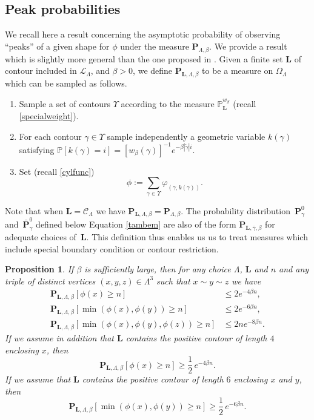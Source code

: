 \documentclass[JEP,XML,SOM,Unicode, NoFloatCountersInSection]{cedram}
\let\mathcal\mathscr
\numberwithin{equation}{section}
\theoremstyle{plain}
\newtheorem{proposition}[theorem]{Proposition}
\theoremstyle{definition}
\newcommand{\cC}{{\ensuremath{\mathcal C}} }
\newcommand{\cL}{{\ensuremath{\mathcal L}} }
\newcommand{\bP}{{\ensuremath{\mathbf P}} }
\newcommand{\bL}{{\ensuremath{\mathbf L}} }
\newcommand{\bbP}{{\ensuremath{\mathbb P}} }
\newcommand{\gb}{\beta}
\newcommand{\gO}{\Omega}
\newcommand{\gL}{\Lambda}
\begin{document}
\subsection{Peak probabilities}\label{peaksec}

We recall here a result concerning the asymptotic probability of observing ``peaks'' of a given shape for $\phi$ under the measure $\bP_{\gL,\gb}$.
We provide a result which is slightly more general than the one proposed in \cite[Prop.\,4.5]{cf:part1}.
Given a finite set $\bL$ of contour included in $\cL_\gL$, and $\gb>0$, we define $\bP_{\bL,\gL,\gb}$ to be a measure on $\gO_{\gL}$
which can be sampled as follows.
\begin{enumerate}
\item [(A)] Sample a set of contours $\Upsilon$ according to the measure $\bbP^{w_{\gb}}_{\bL}$ (recall \eqref{specialweight}).
\item [(B)] For each contour $\gamma\in \Upsilon$ sample independently a geometric variable $k(\gamma)$ satisfying
$\bbP[k(\gamma)=i]=[w_{\gb}(\gamma)]^{-1} e^{-\gb|\tilde \gamma|i}$.
\item [(C)] Set (recall \eqref{cylfunc})
\[
\phi:=\sum_{\gamma\in \Upsilon} \varphi_{(\gamma,k(\gamma))}.
\]
\end{enumerate}
Note that when $\bL=\cC_{\gL}$ we have $\bP_{\bL,\gL,\gb}=\bP_{\gL,\gb}$. The probability distribution~$\bP^0_{\gamma}$ and~$\bar \bP^0_{\gamma}$ defined below
Equation \eqref{tambem} are also of the form $\bP_{\bL,\bar \gamma,\gb}$ for adequate choices of~$\bL$.
This definition thus enables us us to treat measures which include special boundary condition or contour restriction.

\begin{proposition}\label{rouxrou}
If $\gb$ is sufficiently large, then for any choice $\gL$, $\bL$ and $n$ and any triple of distinct vertices $(x,y,z)\in \gL^3$
such that $x\sim y \sim z$ we have
\begin{equation}\label{zups}
\begin{split}
\bP_{\bL,\gL,\gb}[\phi(x)\ge n]&\le 2 e^{-4\gb n},\\
\bP_{\bL,\gL,\gb}[\min(\phi(x),\phi(y)) \ge n]&\le 2 e^{-6\gb n},\\
\bP_{\bL,\gL,\gb}[\min(\phi(x),\phi(y),\phi(z))\ge n]&\le 2 ne^{-8\gb n}.
\end{split}
\end{equation}
If we assume in addition that $\bL$ contains the positive contour of length $4$ enclosing $x$, then
\begin{equation}\label{infin}
\bP_{\bL,\gL,\gb}[\phi(x)\ge n]\ge \frac{1}{2}\, e^{-4\gb n}.
\end{equation}
If we assume that $\bL$ contains the positive contour of length $6$ enclosing $x$ and $y$, then
\begin{equation}\label{infde}
\bP_{\bL,\gL,\gb}[\min (\phi(x),\phi(y))\ge n]\ge \frac{1}{2}\, e^{-6\gb n}.
\end{equation}
\end{proposition}
\end{document}
